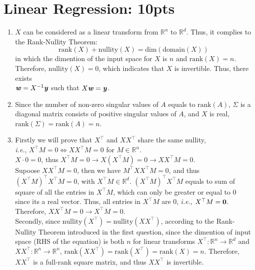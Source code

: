 \documentclass[12pt]{article}
\begin{document}
\section{Linear Regression: 10pts}
\begin{enumerate}
    \item $X$ can be considered as a linear transform from $\mathbb{R}^n$ to 
    $\mathbb{R}^d$. Thus, it complies to the Rank-Nullity Theorem: 
    \[\text{rank}(X) + \text{nullity}(X) = \text{dim}(\text{domain}(X))\]
    in which the dimention of the input space for $X$ is $n$ and $\text{rank}(X) = n$.\\
    Therefore, $\text{nullity}(X) = 0$, which indicates that $X$ is invertible. Thus,
    there exists\\ $\textbf{\textit{w}} = X^{-1}\textbf{\textit{y}}$ such that 
    $X\textbf{\textit{w}} = \textbf{\textit{y}}$.
    \item Since the number of non-zero singular values of $A$ equals to $\text{rank}(A)$, 
    $\Sigma$ is a diagonal matrix consists of positive singular values of $A$, and $X$
    is real, $\text{rank}(\Sigma) = \text{rank}(A) = n$.
    \item Firstly we will prove that $X^{\top}$ and $XX^{\top}$ share the same nullity,\\
    \textit{i.e.}, $X^{\top}M = 0 \iff XX^{\top}M = 0$ for $M \in \mathbb{R}^n$.\\
    $X \cdot 0 = 0$, thus $X^{\top}M = 0 \rightarrow X(X^{\top}M) = 0 \rightarrow XX^{\top}M = 0$.
    \\Supoose $XX^{\top}M = 0$, then we have $M^{\top}XX^{\top}M = 0$, and thus
    $(X^{\top}M)^{\top}X^{\top}M = 0$, with $X^{\top}M \in \mathbb{R}^d$.
    $(X^{\top}M)^{\top}X^{\top}M$ equals to sum of square of all the entries in $X^{\top}M$,
    which can only be greater or equal to 0 since its a real vector. Thus, all entries in
    $X^{\top}M$ are 0, \textit{i.e.}, $X^{\top}M = \bf{0}$. Therefore, 
    $XX^{\top}M = 0 \rightarrow X^{\top}M = 0$.\\
    Secondly, since $\text{nullity}(X^{\top}) = \text{nullity}(XX^{\top})$, according to the 
    Rank-Nullity Theorem introduced in the first question, since the dimention of input space
    (RHS of the equation) is both $n$ for linear transforms
    $X^{\top}:\mathbb{R}^n \rightarrow \mathbb{R}^d$ and 
    $XX^{\top}: \mathbb{R}^n \rightarrow \mathbb{R}^n$, 
    $\text{rank}(XX^{\top}) = \text{rank}(X^{\top}) = \text{rank}(X) = n$. 
    Therefore, $XX^{\top}$ is a full-rank square matrix, and thus $XX^{\top}$ is invertible.
\end{enumerate}
\end{document}
